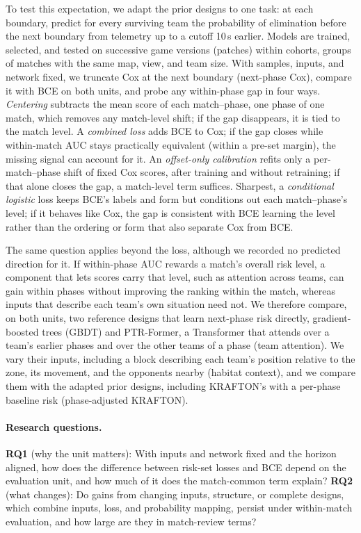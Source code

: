 \documentclass[sigconf,anonymous]{acmart}
\begin{document}
To test this expectation, we adapt the prior designs to one task: at each boundary, predict for every surviving team the probability of elimination before the next boundary from telemetry up to a cutoff 10\,s earlier. Models are trained, selected, and tested on successive game versions (patches) within cohorts, groups of matches with the same map, view, and team size. With samples, inputs, and network fixed, we truncate Cox at the next boundary (next-phase Cox), compare it with BCE on both units, and probe any within-phase gap in four ways. \emph{Centering} subtracts the mean score of each match--phase, one phase of one match, which removes any match-level shift; if the gap disappears, it is tied to the match level. A \emph{combined loss} adds BCE to Cox; if the gap closes while within-match AUC stays practically equivalent (within a pre-set margin), the missing signal can account for it. An \emph{offset-only calibration} refits only a per-match--phase shift of fixed Cox scores, after training and without retraining; if that alone closes the gap, a match-level term suffices. Sharpest, a \emph{conditional logistic} loss keeps BCE's labels and form but conditions out each match--phase's level; if it behaves like Cox, the gap is consistent with BCE learning the level rather than the ordering or form that also separate Cox from BCE.

The same question applies beyond the loss, although we recorded no predicted direction for it. If within-phase AUC rewards a match's overall risk level, a component that lets scores carry that level, such as attention across teams, can gain within phases without improving the ranking within the match, whereas inputs that describe each team's own situation need not. We therefore compare, on both units, two reference designs that learn next-phase risk directly, gradient-boosted trees (GBDT) and PTR-Former, a Transformer that attends over a team's earlier phases and over the other teams of a phase (team attention). We vary their inputs, including a block describing each team's position relative to the zone, its movement, and the opponents nearby (habitat context), and we compare them with the adapted prior designs, including KRAFTON's with a per-phase baseline risk (phase-adjusted KRAFTON).

\paragraph{Research questions.}
\textbf{RQ1} (why the unit matters): With inputs and network fixed and the horizon aligned, how does the difference between risk-set losses and BCE depend on the evaluation unit, and how much of it does the match-common term explain?
\textbf{RQ2} (what changes): Do gains from changing inputs, structure, or complete designs, which combine inputs, loss, and probability mapping, persist under within-match evaluation, and how large are they in match-review terms?
\end{document}

